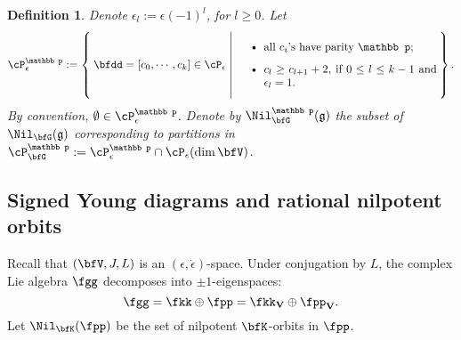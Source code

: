 \documentclass[12pt,a4paper]{amsart}
\newcommand{\g}{\mathfrak g}
\def\DD{\nabla}
\numberwithin{equation}{section}
\newtheorem{defn}[thm]{Definition}
\theoremstyle{remark}
\begin{document}
\begin{defn}\label{def:c} Denote $\epsilon_l := \epsilon (-1)^{l}$, for $l\geq 0$. Let
\[
\cP^{\mathbb p}_{\epsilon}:= \Set{\bfdd = [c_0,\cdots, c_k]\in
  \cP_{\epsilon}|  \parbox[c]{18em}{
    \begin{itemize}
    \item all $c_i$'s have parity $\mathbb p$;
    \item $c_{l} \geq c_{l+1} + 2$, if $0\leq l\leq k-1$ and $\epsilon_l = 1$.
        \end{itemize}}
}.
\]
By convention, $\emptyset \in \cP^{\mathbb p}_{\epsilon}$.
Denote by $\Nil^{\mathbb p}_{\bfG}(\g)$ the subset of $\Nil_{\bfG}(\g)$ corresponding to
partitions in $\cP^{\mathbb p}_{\bfG}:=\cP^{\mathbb p}_{\epsilon}\cap  \cP_{\epsilon}(\dim \bfV)$.
\end{defn}




\subsection{Signed Young diagrams and rational nilpotent orbits}\label{subsec:SYD}
Recall that $(\bfV, J,L)$ is an
$(\epsilon, \dot \epsilon)$-space. %
Under conjugation by $L$, the complex Lie algebra $\fgg$ decomposes into
$\pm 1$-eigenspaces:
\begin{equation}\label{eq:k+p}
\fgg  = \fkk\oplus \fpp=\fkk_{\bf V} \oplus \fpp_{\bf V}.
\end{equation}
Let  $\Nil_{\bfK}(\fpp)$ be the set of nilpotent $\bfK$-orbits in
$\fpp$.
\end{document}
